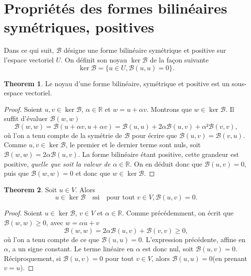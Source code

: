 \documentclass[12pt, final]{scrartcl}
\theoremstyle{definition}
\newtheorem{theorem}{Theorem}
\newcommand{\reals}{\mathbb{R}}
\begin{document}
\section{Propriétés des formes bilinéaires symétriques, positives}

Dans ce qui suit, \(\mathcal{B}\) désigne une forme bilinéaire symétrique et
positive sur l'espace vectoriel \(U\). On définit son noyau \(\ker \mathcal{B}\)
de la façon suivante
\begin{equation}
 \ker \mathcal{B}= \bigl\{ u ∈ U, \mathcal{B}(u, u) = 0 \bigr\} .
\end{equation}

\begin{theorem}
  Le noyau d'une forme bilinéaire, symétrique et positive est un sous-espace
  vectoriel.
\end{theorem}
\begin{proof}
  Soient \(u, v∈\ker \mathcal{B}\), \(α∈\reals\) et \(w = u + α v\). Montrons
  que \(w ∈ \ker\mathcal{B}\). Il suffit d'évaluer \(\mathcal{B}(w, w)\)
 \begin{equation}
   \mathcal{B}(w, w) = \mathcal{B}(u + α v, u + α v)
   = \mathcal{B}(u, u) + 2 α \mathcal{B}(u, v) + α² \mathcal{B}(v, v),
 \end{equation}
 où l'on a tenu compte de la symétrie de \(\mathcal{B}\) pour écrire que
 \(\mathcal{B}(u, v) =\mathcal{B}(v, u)\). Comme \(u, v ∈ \ker\mathcal{B}\), le
 premier et le dernier terme sont nuls, soit
 \(\mathcal{B}(w, w) = 2α \mathcal{B}(u, v)\). La forme bilinéaire étant
 positive, cette grandeur est positive, \emph{quelle que soit la valeur de
   \(α∈\reals\)}. On en déduit donc que \(\mathcal{B}(u, v) = 0\), puis que
 \(\mathcal{B}(w, w) = 0\) et donc que \(w ∈ \ker\mathcal{B}\).
\end{proof}

\begin{theorem}
 Soit \(u∈V\). Alors
 \begin{equation}
  u ∈ \ker\mathcal{B} \quad \text{ssi} \quad \text{pour tout } v ∈ V, \mathcal{B}(u, v) = 0.
 \end{equation}
\end{theorem}

\begin{proof}
  Soient \(u∈\ker \mathcal{B}\), \(v∈V\) et \(α∈\reals\). Comme précédemment, on
  écrit que \(\mathcal{B}(w, w) ≥ 0\), avec \(w = α u + v\)
 \begin{equation}
  \mathcal{B}(w, w) = 2 α \mathcal{B}(u, v) +\mathcal{B}(v, v) \geq
  0,
 \end{equation}
 où l'on a tenu compte de ce que \(\mathcal{B}(u, u) = 0\). L'expression
 précédente, affine en \(α\), a un signe constant. Le terme linéaire en \(α\)
 est donc nul, soit \(\mathcal{B}(u, v) = 0\).  Réciproquement, si
 \(\mathcal{B}(u, v) = 0\) pour tout \(v∈V\), alors \(\mathcal{B}(u, u) = 0\)(en
 prenant \(v = u\)).
\end{proof}
\end{document}
